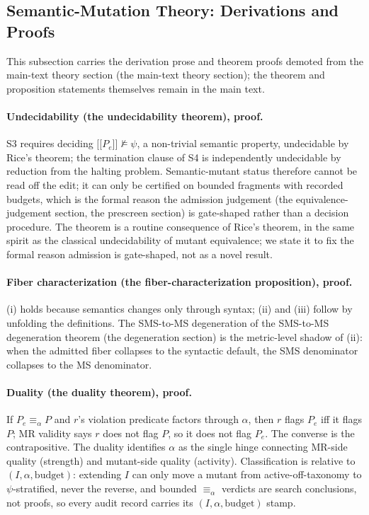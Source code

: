 \documentclass[manuscript,screen,review]{acmart}
\begin{document}
\subsection{Semantic-Mutation Theory: Derivations and Proofs}\label{k.2-theory-derivations}

This subsection carries the derivation prose and theorem proofs demoted from the
main-text theory section (the main-text theory section); the theorem and
proposition statements themselves remain in the main text.

\paragraph{Undecidability (the undecidability theorem), proof.}
S3 requires deciding $\mathopen{\lbrack\!\lbrack} P_e \mathclose{\rbrack\!\rbrack} \not\models \psi$, a non-trivial
semantic property, undecidable by Rice's theorem; the termination clause of S4
is independently undecidable by reduction from the halting problem.
Semantic-mutant status therefore cannot be read off the edit; it can only be
certified on bounded fragments with recorded budgets, which is the formal reason
the admission judgement (the equivalence-judgement section,
the prescreen section) is gate-shaped
rather than a decision procedure. The theorem is a routine consequence of Rice's
theorem, in the same spirit as the classical undecidability of mutant
equivalence; we state it to fix the formal reason admission is gate-shaped, not
as a novel result.

\paragraph{Fiber characterization (the fiber-characterization proposition), proof.}
(i) holds because semantics changes only through syntax; (ii) and (iii) follow by
unfolding the definitions. The SMS-to-MS degeneration of
the SMS-to-MS degeneration theorem (the degeneration section)
is the metric-level shadow of (ii): when the admitted fiber collapses to the
syntactic default, the SMS denominator collapses to the MS denominator.

\paragraph{Duality (the duality theorem), proof.}
If $P_e \equiv_\alpha P$ and $r$'s violation predicate factors through $\alpha$,
then $r$ flags $P_e$ iff it flags $P$; MR validity says $r$ does not flag $P$, so
it does not flag $P_e$. The converse is the contrapositive. The duality
identifies $\alpha$ as the single hinge connecting MR-side quality (strength) and
mutant-side quality (activity). Classification is relative to
$(I, \alpha, \text{budget})$: extending $I$ can only move a mutant from
active-off-taxonomy to $\psi$-stratified, never the reverse, and bounded
$\equiv_\alpha$ verdicts are search conclusions, not proofs, so every audit
record carries its $(I, \alpha, \text{budget})$ stamp.
\end{document}
